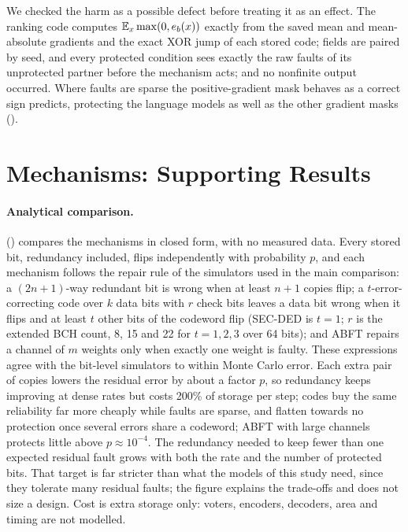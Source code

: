 We checked the harm as a possible defect before treating it as an effect. The ranking code computes $\mathbb{E}_x\max(0,e_b(x))$ exactly from the saved mean and mean-absolute gradients and the exact XOR jump of each stored code; fields are paired by seed, and every protected condition sees exactly the raw faults of its unprotected partner before the mechanism acts; and no nonfinite output occurred. Where faults are sparse the positive-gradient mask behaves as a correct sign predicts, protecting the language models as well as the other gradient masks ().

\section{Mechanisms: Supporting Results}\label{app:mechanisms}
\paragraph{Analytical comparison.}  () compares the mechanisms in closed form, with no measured data. Every stored bit, redundancy included, flips independently with probability $p$, and each mechanism follows the repair rule of the simulators used in the main comparison: a $(2n{+}1)$-way redundant bit is wrong when at least $n{+}1$ copies flip; a $t$-error-correcting code over $k$ data bits with $r$ check bits leaves a data bit wrong when it flips and at least $t$ other bits of the codeword flip (SEC-DED is $t=1$; $r$ is the extended BCH count, 8, 15 and 22 for $t=1,2,3$ over 64 bits); and ABFT repairs a channel of $m$ weights only when exactly one weight is faulty. These expressions agree with the bit-level simulators to within Monte Carlo error. Each extra pair of copies lowers the residual error by about a factor $p$, so redundancy keeps improving at dense rates but costs 200\% of storage per step; codes buy the same reliability far more cheaply while faults are sparse, and flatten towards no protection once several errors share a codeword; ABFT with large channels protects little above $p\approx10^{-4}$. The redundancy needed to keep fewer than one expected residual fault grows with both the rate and the number of protected bits. That target is far stricter than what the models of this study need, since they tolerate many residual faults; the figure explains the trade-offs and does not size a design. Cost is extra storage only: voters, encoders, decoders, area and timing are not modelled.


